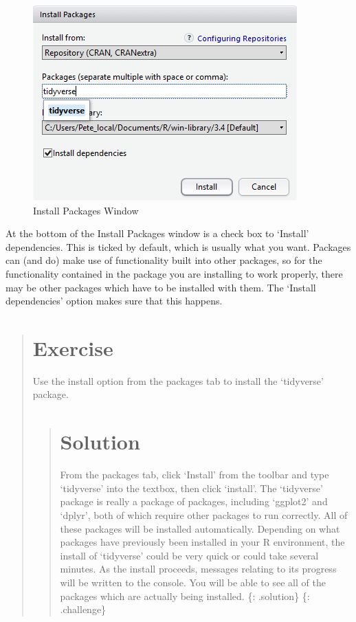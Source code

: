 \documentclass[]{book}
\begin{document}
\begin{figure}
\centering
\includegraphics{../fig/R_00_Rstudio_03.png}
\caption{Install Packages Window}
\end{figure}

At the bottom of the Install Packages window is a check box to `Install'
dependencies. This is ticked by default, which is usually what you want.
Packages can (and do) make use of functionality built into other
packages, so for the functionality contained in the package you are
installing to work properly, there may be other packages which have to
be installed with them. The `Install dependencies' option makes sure
that this happens.

\begin{quote}
\section{Exercise}\label{exercise}

Use the install option from the packages tab to install the `tidyverse'
package.

\begin{quote}
\section{Solution}\label{solution}

From the packages tab, click `Install' from the toolbar and type
`tidyverse' into the textbox, then click `install'. The `tidyverse'
package is really a package of packages, including `ggplot2' and
`dplyr', both of which require other packages to run correctly. All of
these packages will be installed automatically. Depending on what
packages have previously been installed in your R environment, the
install of `tidyverse' could be very quick or could take several
minutes. As the install proceeds, messages relating to its progress will
be written to the console. You will be able to see all of the packages
which are actually being installed. \{: .solution\} \{: .challenge\}
\end{quote}
\end{quote}
\end{document}

